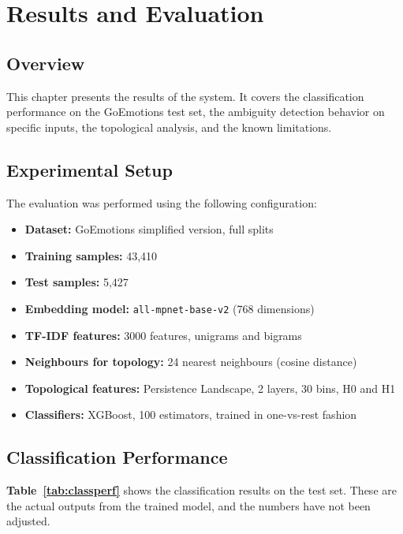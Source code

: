 \chapter{Results and Evaluation}

\section{Overview}

This chapter presents the results of the system. It covers the classification performance on
the GoEmotions test set, the ambiguity detection behavior on specific inputs, the topological
analysis, and the known limitations.

\section{Experimental Setup}

The evaluation was performed using the following configuration:

\begin{itemize}
    \item \textbf{Dataset:} GoEmotions simplified version, full splits
    \item \textbf{Training samples:} 43,410
    \item \textbf{Test samples:} 5,427
    \item \textbf{Embedding model:} \texttt{all-mpnet-base-v2} (768 dimensions)
    \item \textbf{TF-IDF features:} 3000 features, unigrams and bigrams
    \item \textbf{Neighbours for topology:} 24 nearest neighbours (cosine distance)
    \item \textbf{Topological features:} Persistence Landscape, 2 layers, 30 bins, H0 and H1
    \item \textbf{Classifiers:} XGBoost, 100 estimators, trained in one-vs-rest fashion
\end{itemize}

\section{Classification Performance}

\textbf{Table~\ref{tab:classperf}} shows the classification results on the test set. These are the actual
outputs from the trained model, and the numbers have not been adjusted.

